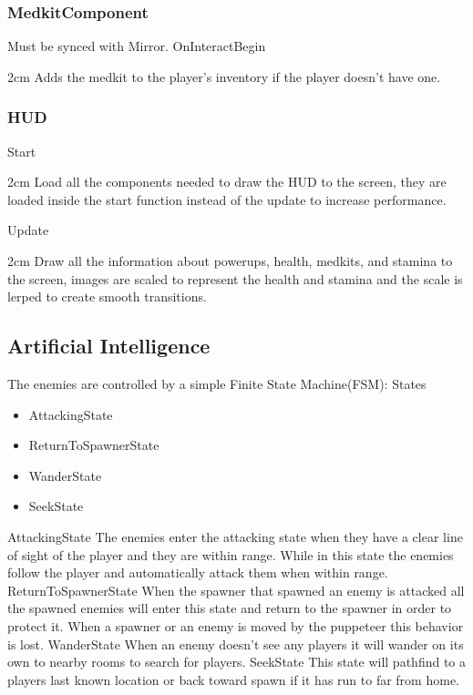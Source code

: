 \documentclass[11pt]{article}
\newenvironment{indentall}{\begin{adjustwidth}{2cm}{}}{\end{adjustwidth}}
\begin{document}
\subsubsection{MedkitComponent}
Must be synced with Mirror.
\newline
\newline OnInteractBegin
\begin{indentall}
Adds the medkit to the player’s inventory if the player doesn’t have one.
\end{indentall}

\subsubsection{HUD}
Start
\begin{indentall}
Load all the components needed to draw the HUD to the screen, they are loaded inside the start function instead of the update to increase performance.
\end{indentall}
Update
\begin{indentall}
Draw all the information about powerups, health, medkits, and stamina to the screen, images are scaled to represent the health and stamina and the scale is lerped to create smooth transitions.	
\end{indentall}

\subsection{Artificial Intelligence}
The enemies are controlled by a simple Finite State Machine(FSM):
\newline
\newline States
\begin{itemize}
	\item AttackingState
	\item ReturnToSpawnerState
	\item WanderState
	\item SeekState
\end{itemize}
AttackingState
\newline
The enemies enter the attacking state when they have a clear line of sight of the player and they are within range. While in this state the enemies follow the player and automatically attack them when within range. 
\newline
\newline ReturnToSpawnerState
\newline
When the spawner that spawned an enemy is attacked all the spawned enemies will enter this state and return to the spawner in order to protect it. When a spawner or an enemy is moved by the puppeteer this behavior is lost.
\newline
\newline WanderState
\newline
When an enemy doesn’t see any players it will wander on its own to nearby rooms to search for players.
\newline
\newline SeekState
\newline
This state will pathfind to a players last known location or back toward spawn if it has run to far from home.
\end{document}
